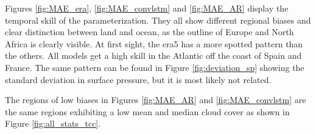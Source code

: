 Figures \ref{fig:MAE_era}, \ref{fig:MAE_convlstm} and \ref{fig:MAE_AR} display the temporal skill of the parameterization. %
They all show different regional biases and clear distinction between land and ocean, as the outline of Europe and North Africa is clearly visible.
At first sight, the \acrshort{era5} has a more spotted pattern than the others. All models get a high skill in the Atlantic off the coast of Spain and France. The same pattern can be found in Figure \ref{fig:deviation_sp} showing the standard deviation in surface pressure, but it is most likely not related.

The regions of low biases in Figures \ref{fig:MAE_AR} and \ref{fig:MAE_convlstm} are the same regions exhibiting a low mean and median cloud cover as shown in Figure \ref{fig:all_stats_tcc}.

